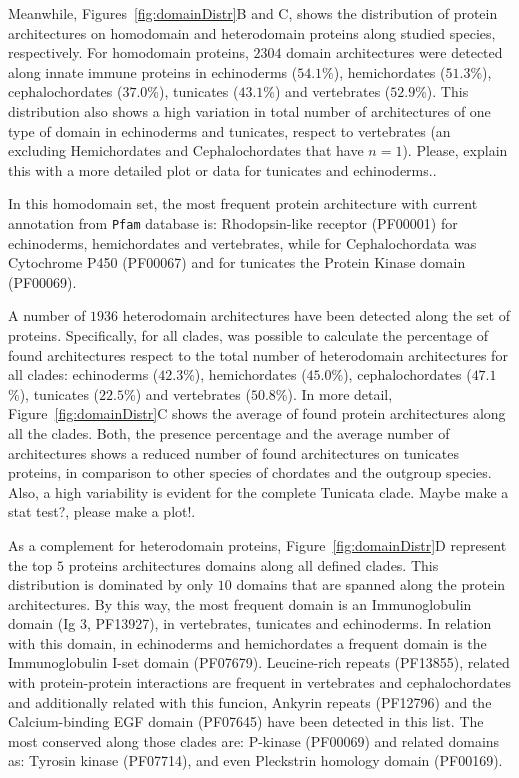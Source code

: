 \documentclass[11pt]{article}
\newcommand{\TODO}[1]{\begingroup\color{red}#1\endgroup}
\begin{document}
Meanwhile, Figures~\ref{fig:domainDistr}B and C, shows the distribution of 
protein architectures on homodomain and heterodomain proteins along studied 
species, respectively. For homodomain proteins, $2304$ domain architectures 
were detected along innate immune proteins in echinoderms ($54.1$\%), 
hemichordates ($51.3$\%), cephalochordates ($37.0$\%), tunicates ($43.1$\%) and 
vertebrates ($52.9$\%). This distribution also shows a high variation in 
total number of architectures of one type of domain in echinoderms and 
tunicates, respect to vertebrates (an excluding Hemichordates and 
Cephalochordates that have $n=1$). \TODO{Please, explain this with a more 
detailed plot or data for tunicates and echinoderms.}.

In this homodomain set, the most frequent protein architecture with 
current annotation from \texttt{Pfam} database is: Rhodopsin-like receptor 
(PF00001) for echinoderms, hemichordates and vertebrates, while for 
Cephalochordata was Cytochrome P450 (PF00067) and for tunicates the Protein 
Kinase domain (PF00069). 

A number of $1936$ heterodomain architectures have been detected along the set 
of proteins. Specifically, for all clades, was possible to calculate 
the percentage of found architectures respect to the total number of 
heterodomain architectures for all clades: echinoderms ($42.3$\%), 
hemichordates ($45.0$\%), cephalochordates ($47.1$\%), tunicates 
($22.5$\%) and vertebrates ($50.8$\%). In more detail, 
Figure~\ref{fig:domainDistr}C shows the average of found protein architectures 
along all the clades. Both, the presence percentage and the average number of 
architectures shows a reduced number of found architectures on tunicates 
proteins, in comparison to other species of chordates and the outgroup species. 
Also, a high variability is evident for the complete Tunicata clade. \TODO{Maybe 
make a stat test?, please make a plot!}.  

As a complement for heterodomain proteins, Figure~\ref{fig:domainDistr}D 
represent the top $5$ proteins architectures domains along all defined clades. 
This distribution is dominated by only $10$ domains that are spanned along 
the protein architectures. By this way, the most frequent domain is an 
Immunoglobulin domain (Ig 3, PF13927), in vertebrates, tunicates and 
echinoderms. In relation with this domain, in echinoderms and hemichordates a 
frequent domain is the Immunoglobulin I-set domain (PF07679). Leucine-rich 
repeats (PF13855), related with protein-protein interactions are frequent in 
vertebrates and cephalochordates and additionally related with this funcion, 
Ankyrin repeats (PF12796) and the Calcium-binding EGF domain (PF07645) have 
been detected in this list. The most conserved along those clades are: P-kinase 
(PF00069) and related domains as: Tyrosin kinase (PF07714), and even Pleckstrin 
homology domain (PF00169). 
\end{document}

